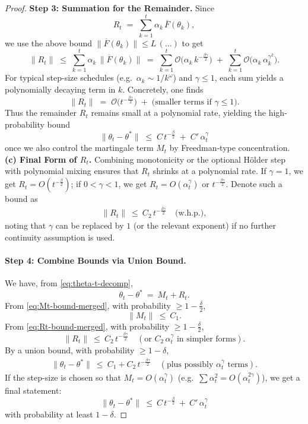 \begin{proof}
\smallskip
\noindent
\textbf{Step 3: Summation for the Remainder.}
Since
\[
  R_t
  \;=\;
  \sum_{k=1}^t 
    \alpha_k \,\overline{F}(\theta_k),
\]
we use the above bound 
$\|\overline{F}(\theta_k)\| \le L\,(\dots)$ to get
\[
  \bigl\|R_t\bigr\|
  \;\le\;
  \sum_{k=1}^t \alpha_k \,\|\overline{F}(\theta_k)\|
  \;=\;
  \sum_{k=1}^t
     \mathcal{O}\!\bigl(
       \alpha_k \,k^{-\tfrac{\beta\gamma}{2}}
     \bigr)
  \;+\;
  \sum_{k=1}^t
     \mathcal{O}\!\bigl(
       \alpha_k \,\alpha_k^{\gamma^2}
     \bigr).
\]
For typical step-size schedules (e.g.\ $\alpha_k \sim 1/k^\omega$) and $\gamma\le1$, each sum yields a polynomially decaying term in $k$. Concretely, one finds
\[
  \|R_t\|
  \;=\;
  \mathcal{O}\!\bigl(t^{-\tfrac{\beta\gamma}{2}}\bigr)
  \;+\;
  \text{(smaller terms if }\gamma\le1\text{)}.
\]
Thus the remainder $R_t$ remains small at a polynomial rate, yielding the high-probability bound
\[
  \|\theta_t - \theta^*\|
  \;\le\;
  C\,t^{-\tfrac{\beta}{2}}
  \;+\;
  C'\,\alpha_t^\gamma
\]
once we also control the martingale term $M_t$ by Freedman‐type concentration.
\smallskip
\noindent
\textbf{(c) Final Form of \boldmath$R_t$.}
Combining monotonicity or the optional H\"older step with polynomial mixing ensures that $R_t$ shrinks at a polynomial rate.  If \(\gamma=1\), we get $R_t=O(t^{-\frac{\beta}{2}})$; if $0<\gamma<1$, we get $R_t=O(\alpha_t^\gamma)$ or $t^{-\tfrac{\beta\gamma}{2}}$.  Denote such a bound as
\begin{align}
\label{eq:Rt-bound-merged}
\|R_t\|
~\le~
C_2\,t^{-\tfrac{\beta\gamma}{2}}
\quad\text{(w.h.p.)},
\end{align}
noting that $\gamma$ can be replaced by $1$ (or the relevant exponent) if no further continuity assumption is used.

\paragraph{Step 4: Combine Bounds via Union Bound.}

We have, from \eqref{eq:theta-t-decomp},
\[
  \theta_t - \theta^*
  ~=~
  M_t + R_t.
\]
From \eqref{eq:Mt-bound-merged}, with probability $\ge1-\frac{\delta}{2}$,
\[
  \|M_t\|
  ~\le~
  C_1.
\]
From \eqref{eq:Rt-bound-merged}, with probability $\ge1-\frac{\delta}{2}$,
\[
  \|R_t\|
  ~\le~
  C_2\,t^{-\tfrac{\beta\gamma}{2}}
  \quad(\text{or }C_2\,\alpha_t^\gamma\text{ in simpler forms}).
\]
By a union bound, with probability $\ge1-\delta$,
\begin{align}
\|\theta_t - \theta^*\|
~\le~
C_1 + C_2\,t^{-\tfrac{\beta\gamma}{2}}
\quad(\text{plus possibly $\alpha_t^\gamma$ terms}).
\label{eq:theta-final-merged}
\end{align}
If the step-size is chosen so that $M_t=O(\alpha_t^\gamma)$ (e.g.\ $\sum\alpha_t^2=O(\alpha_t^{2\gamma})$), we get a final statement:
\[
  \|\theta_t-\theta^*\|
  ~\le~
  C\,t^{-\tfrac{\beta}{2}}
  ~+~
  C'\,\alpha_t^\gamma
\]
with probability at least $1-\delta$.  
\end{proof}

